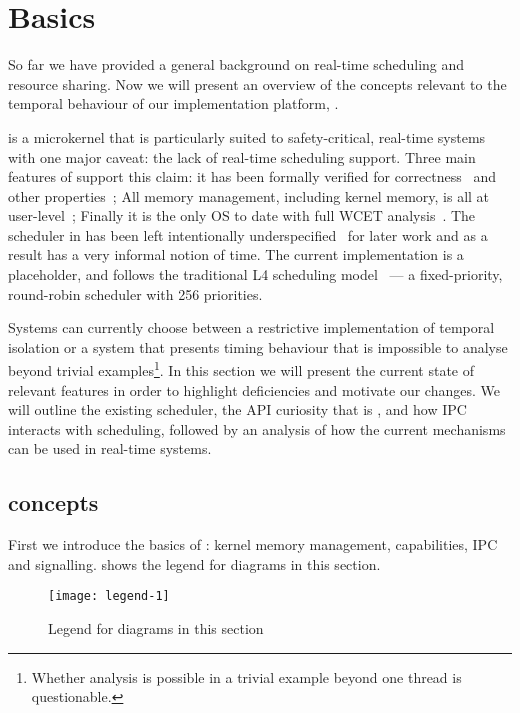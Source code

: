 

\chapter{\selfour Basics}
\label{chap:sel4}

So far we have provided a general background on real-time scheduling and resource sharing.
Now we will present an overview of the concepts relevant to the temporal behaviour of our implementation platform, \selfour.

\selfour is a microkernel that is particularly suited to safety-critical, real-time systems with one major caveat: the lack of real-time scheduling support. 
Three main features of \selfour support this claim: it has been formally verified for correctness~\citep{Klein_EHACDEEKNSTW_09} and other properties~\citep{Sewell_WGMAK_11}; All memory management, including kernel memory, is all at user-level~\citep{Elkaduwe_Derrin_06}; Finally it is the only \gls{OS} to date with full \gls{WCET} analysis~\citep{Blackham_SCRH_11}.
The scheduler in \selfour has been left intentionally underspecified~\citep{Petters_EH_12} for later work and as a result has a very informal notion of time.
The current implementation is a placeholder, and follows the traditional L4 scheduling model~\citep{Ruocco_06} --- a fixed-priority, round-robin scheduler with 256 priorities.

Systems can currently choose between a restrictive implementation of temporal isolation or a system that presents timing behaviour that is impossible to analyse beyond trivial examples\footnote{Whether analysis is possible in a trivial example beyond one thread is questionable.}.
In this section we will present the current state of relevant \selfour features in order to highlight deficiencies and motivate our changes.
We will outline the existing scheduler, the API curiosity that is \yield, and how \gls{IPC} interacts with scheduling, followed by an analysis of how the current mechanisms can be used in real-time systems.


\section{\selfour concepts}

First we introduce the basics of \selfour: kernel memory management, capabilities, \gls{IPC} and
signalling.  shows the legend for diagrams in this section. 

\begin{figure}
    \centering
    \texttt{[image: legend-1]}
    \caption{Legend for diagrams in this section}
    \label{f:legend-1}
\end{figure}

